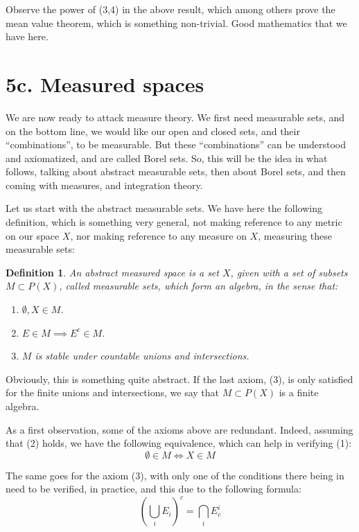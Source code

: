 \documentclass[12pt]{amsbook}
\newtheorem{definition}[theorem]{Definition}
\begin{document}
Observe the power of (3,4) in the above result, which among others prove the mean value theorem, which is something non-trivial. Good mathematics that we have here.

\section*{5c. Measured spaces}

We are now ready to attack measure theory. We first need measurable sets, and on the bottom line, we would like our open and closed sets, and their ``combinations'', to be measurable. But these ``combinations'' can be understood and axiomatized, and are called Borel sets. So, this will be the idea in what follows, talking about abstract measurable sets, then about Borel sets, and then coming with measures, and integration theory. 

\bigskip

Let us start with the abstract measurable sets. We have here the following definition, which is something very general, not making reference to any metric on our space $X$, nor making reference to any measure on $X$, measuring these measurable sets:


\begin{definition}
An abstract measured space is a set $X$, given with a set of subsets $M\subset P(X)$, called measurable sets, which form an algebra, in the sense that:
\begin{enumerate}
\item $\emptyset,X\in M$.

\item $E\in M\implies E^c\in M$.

\item $M$ is stable under countable unions and intersections.
\end{enumerate}
\end{definition}

Obviously, this is something quite abstract. If the last axiom, (3), is only satisfied for the finite unions and intersections, we say that $M\subset P(X)$ is a finite algebra.

\bigskip

As a first observation, some of the axioms above are redundant. Indeed, assuming that (2) holds, we have the following equivalence, which can help in verifying (1):
$$\emptyset\in M\iff X\in M$$

The same goes for the axiom (3), with only one of the conditions there being in need to be verified, in practice, and this due to the following formula:
$$\left(\bigcup_iE_i\right)^c=\bigcap_iE_c^i$$
\end{document}

